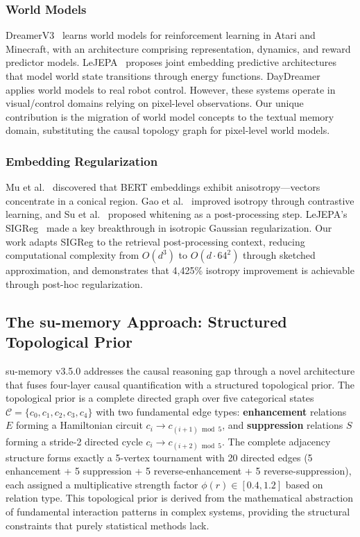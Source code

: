 \documentclass[11pt,a4paper]{article}
\begin{document}
\subsubsection{World Models}

DreamerV3~\cite{hafner2023} learns world models for reinforcement learning in Atari and Minecraft, with an architecture comprising representation, dynamics, and reward predictor models. LeJEPA~\cite{lejepa2025} proposes joint embedding predictive architectures that model world state transitions through energy functions. DayDreamer~\cite{wu2023} applies world models to real robot control. However, these systems operate in visual/control domains relying on pixel-level observations. Our unique contribution is the migration of world model concepts to the textual memory domain, substituting the causal topology graph for pixel-level world models.

\subsubsection{Embedding Regularization}

Mu et al.~\cite{mu2018} discovered that BERT embeddings exhibit anisotropy---vectors concentrate in a conical region. Gao et al.~\cite{gao2021} improved isotropy through contrastive learning, and Su et al.~\cite{su2021} proposed whitening as a post-processing step. LeJEPA's SIGReg~\cite{lejepa2025} made a key breakthrough in isotropic Gaussian regularization. Our work adapts SIGReg to the retrieval post-processing context, reducing computational complexity from \(O(d^3)\) to \(O(d \cdot 64^2)\) through sketched approximation, and demonstrates that 4,425\% isotropy improvement is achievable through post-hoc regularization.

\subsection{The su-memory Approach: Structured Topological Prior}

su-memory v3.5.0 addresses the causal reasoning gap through a novel architecture that fuses four-layer causal quantification with a structured topological prior. The topological prior is a complete directed graph over five categorical states \(\mathcal{C} = \{c_0, c_1, c_2, c_3, c_4\}\) with two fundamental edge types: \textbf{enhancement} relations \(E\) forming a Hamiltonian circuit \(c_i \to c_{(i+1)\bmod 5}\), and \textbf{suppression} relations \(S\) forming a stride-2 directed cycle \(c_i \to c_{(i+2)\bmod 5}\). The complete adjacency structure forms exactly a 5-vertex tournament with 20 directed edges (5 enhancement + 5 suppression + 5 reverse-enhancement + 5 reverse-suppression), each assigned a multiplicative strength factor \(\phi(r) \in [0.4, 1.2]\) based on relation type. This topological prior is derived from the mathematical abstraction of fundamental interaction patterns in complex systems, providing the structural constraints that purely statistical methods lack.
\end{document}
